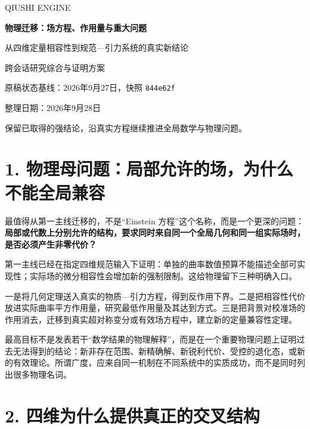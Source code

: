 \documentclass[UTF8,a4paper,11pt,fontset=fandol]{ctexart}
\begin{document}
\begin{titlepage}
\thispagestyle{empty}
\vspace*{2cm}
{\large\sffamily QIUSHI ENGINE\par}
\vspace{1.3cm}
{\Huge\bfseries 物理迁移：场方程、作用量与重大问题\par}
\vspace{0.8cm}
{\Large 从四维定量相容性到规范---引力系统的真实新结论\par}
\vspace{1.2cm}
{\large 跨会话研究综合与证明方案\par}
\vfill
{\normalsize 原稿状态基线：2026年9月27日，快照 \texttt{844e62f}\par}
\vspace{0.35cm}
{\normalsize 整理日期：2026年9月28日\par}
\vspace{1cm}
{\small 保留已取得的强结论，沿真实方程继续推进全局数学与物理问题。\par}
\end{titlepage}
\tableofcontents
\clearpage
\section{1.
物理母问题：局部允许的场，为什么不能全局兼容}\label{ux7269ux7406ux6bcdux95eeux9898ux5c40ux90e8ux5141ux8bb8ux7684ux573aux4e3aux4ec0ux4e48ux4e0dux80fdux5168ux5c40ux517cux5bb9}

最值得从第一主线迁移的，不是``Einstein
方程''这个名称，而是一个更深的问题：\textbf{局部或代数上分别允许的结构，要求同时来自同一个全局几何和同一组实际场时，是否必须产生非零代价？}

第一主线已经在指定四维规范输入下证明：单独的曲率数值预算不能描述全部可实现性；实际场的微分相容性会增加新的强制限制。这给物理留下三种明确入口。

一是将几何定理送入真实的物质---引力方程，得到反作用下界。二是把相容性代价放进实际曲率平方作用量，研究最低作用量及其达到方式。三是把背景对校准场的作用消去，迁移到真实超对称变分或有效场方程中，建立新的定量兼容性定理。

最高目标不是发表若干``数学结果的物理解释''，而是在一个重要物理问题上证明过去无法得到的结论：新非存在范围、新精确解、新锐利代价、受控的退化态，或新的有效理论。所谓广度，应来自同一机制在不同系统中的实质成功，而不是同时列出很多物理名词。

\section{2.
四维为什么提供真正的交叉结构}\label{ux56dbux7ef4ux4e3aux4ec0ux4e48ux63d0ux4f9bux771fux6b63ux7684ux4ea4ux53c9ux7ed3ux6784}
\end{document}
